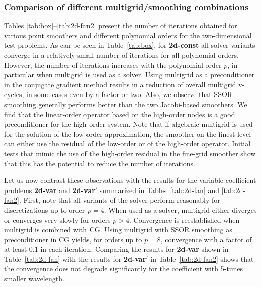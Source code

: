 \documentclass[smallcondensed,final]{svjour3}     %
\begin{document}
\subsubsection{Comparison of different multigrid/smoothing combinations}\label{subsec:num_point}
Tables \ref{tab:box}--\ref{tab:2d-fan2} present the number of
iterations obtained for various point smoothers and different
polynomial orders for the two-dimensional test problems. As can be
seen in Table~\ref{tab:box}, for {\bf 2d-const}
all solver variants converge in a
relatively small number of iterations for all polynomial
orders. However, the number of
iterations increases with the polynomial order $p$, in particular when
multigrid is used as a solver. Using multigrid as a preconditioner in
the conjugate gradient method results in a reduction of overall
multigrid v-cycles, in some cases even by a factor or two. Also, we
observe that SSOR smoothing generally performs better than the two
Jacobi-based smoothers. We find that the linear-order operator based
on the high-order nodes is a good preconditioner for the high-order
system. Note that if algebraic multigrid is used for the solution of
the low-order approximation, the smoother on the finest level can
either use the residual of the low-order or of the high-order
operator. Initial tests that mimic the use of the high-order residual
in the fine-grid smoother show that this has the potential to reduce the
number of iterations.

%

Let us now contrast these observations with the results for the
variable coefficient problems {\bf 2d-var} and {\bf 2d-var$'$}
summarized in Tables~\ref{tab:2d-fan} and \ref{tab:2d-fan2}. First,
note that all variants of the solver perform reasonably for
discretizations up to order $p=4$. When used as a solver, multigrid
either diverges or converges very slowly for orders $p>4$. Convergence
is reestablished when multigrid is combined with CG. Using multigrid
with SSOR smoothing as preconditioner in CG yields, for orders up to
$p=8$, convergence with a factor of at least $0.1$ in each iteration.
Comparing the results for {\bf 2d-var} shown in Table~\ref{tab:2d-fan}
with the results for {\bf 2d-var$'$} in Table~\ref{tab:2d-fan2} shows
that the convergence does not degrade significantly for the
coefficient with 5-times smaller wavelength.
\end{document}
